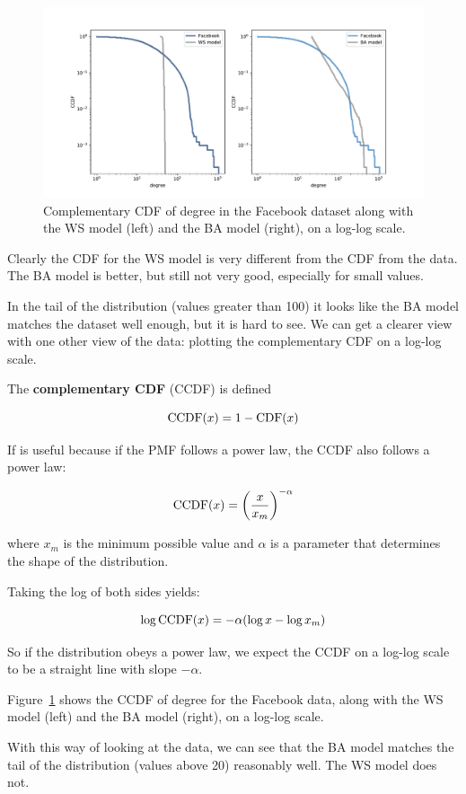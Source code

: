 \documentclass[12pt]{book}
\theoremstyle{exercise}
\begin{document}
\begin{figure}
\centerline{\includegraphics[width=5.5in]{figs/chap04-5.pdf}}
\caption{Complementary CDF of degree in the Facebook dataset along with the WS model (left) and the BA model (right), on a log-log scale.}
\label{chap04-5}
\end{figure}

Clearly the CDF for the WS model is very different from the CDF
from the data.  The BA model is better, but still not very good,
especially for small values.

In the tail of the distribution (values greater than 100) it looks
like the BA model matches the dataset well enough, but it is
hard to see.  We can get a clearer view with one other view of the
data: plotting the complementary CDF on a log-log scale.

The {\bf complementary CDF} (CCDF) is defined

\[ \mathrm{CCDF}(x) = 1 - \mathrm{CDF}(x) \]

If is useful because if the PMF follows a power law, the CCDF
also follows a power law:

\[ \mathrm{CCDF}(x) = \left( \frac{x}{x_m} \right)^{-\alpha} \]

where $x_m$ is the minimum possible value and $\alpha$ is a parameter
that determines the shape of the distribution.

Taking the log of both sides yields:

\[ \log \mathrm{CCDF}(x) = -\alpha (\log x - \log x_m) \]

So if the distribution obeys a power law, we expect the CCDF on
a log-log scale to be a straight line with slope $-\alpha$.

Figure~\ref{chap04-5} shows the CCDF of degree for the Facebook data,
along with the WS model (left) and the BA model (right), on a log-log
scale.

With this way of looking at the data, we can see that the BA model
matches the tail of the distribution (values above 20) reasonably well.
The WS model does not.
\end{document}

